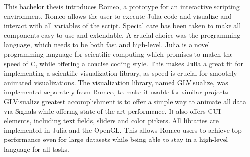 This bachelor thesis introduces Romeo, a prototype for an interactive scripting environment.
Romeo allows the user to execute Julia code and visualize and interact with all variables of the script.
Special care has been taken to make all components easy to use and extendable.
A crucial choice was the programming language, which needs to be both fast and high-level.
Julia is a novel programming language for scientific computing which promises to match the speed of C, while offering a concise coding style. 
This makes Julia a great fit for implementing a scientific visualization library, as speed is crucial for smoothly animated visualizations.
The visualization library, named GLVisualize, was implemented separately from Romeo, to make it usable for similar projects. 
GLVisualize greatest accomplishment is to offer a simple way to animate all data via Signals while offering state of the art performance.
It also offers \ac{GUI} elements, including text fields, sliders and color pickers. 
All libraries are implemented in Julia and the \ac{OpenGL}.
This allows Romeo users to achieve top performance even for large datasets while being able to stay in a high-level language for all tasks.
